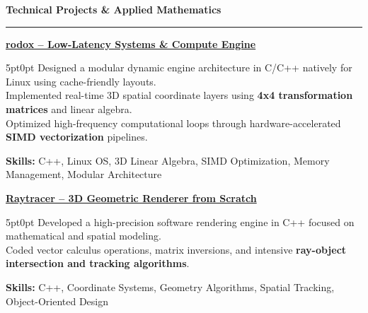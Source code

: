 \documentclass[9pt]{extarticle}
\begin{document}
\par\vspace{5pt}

{\large\bfseries Technical Projects \& Applied Mathematics}
\par\vspace{-8pt}
\rule{\linewidth}{0.4pt}
\par\vspace{5pt}

\underline{\bfseries rodox -- Low-Latency Systems \& Compute Engine}
\par
\begin{adjustwidth}{5pt}{0pt}
    Designed a modular dynamic engine architecture in C/C++ natively for Linux using cache-friendly layouts. \\
    Implemented real-time 3D spatial coordinate layers using {\bfseries 4x4 transformation matrices} and linear algebra. \\
    Optimized high-frequency computational loops through hardware-accelerated {\bfseries SIMD vectorization} pipelines.
\end{adjustwidth}
\par
{\bfseries Skills:} C++, Linux OS, 3D Linear Algebra, SIMD Optimization, Memory Management, Modular Architecture

\par\vspace{8pt}

\underline{\bfseries Raytracer -- 3D Geometric Renderer from Scratch}
\par
\begin{adjustwidth}{5pt}{0pt}
    Developed a high-precision software rendering engine in C++ focused on mathematical and spatial modeling. \\
    Coded vector calculus operations, matrix inversions, and intensive {\bfseries ray-object intersection and tracking algorithms}.
\end{adjustwidth}
\par
{\bfseries Skills:} C++, Coordinate Systems, Geometry Algorithms, Spatial Tracking, Object-Oriented Design

\par\vspace{8pt}
\end{document}
